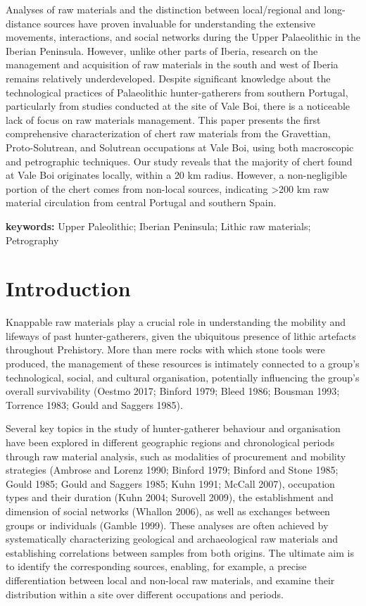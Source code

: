 \documentclass[
  a4paper,
  DIV=11,
  numbers=noendperiod]{scrreprt}
\begin{document}

Analyses of raw materials and the distinction between local/regional and
long-distance sources have proven invaluable for understanding the
extensive movements, interactions, and social networks during the Upper
Palaeolithic in the Iberian Peninsula. However, unlike other parts of
Iberia, research on the management and acquisition of raw materials in
the south and west of Iberia remains relatively underdeveloped. Despite
significant knowledge about the technological practices of Palaeolithic
hunter-gatherers from southern Portugal, particularly from studies
conducted at the site of Vale Boi, there is a noticeable lack of focus
on raw materials management. This paper presents the first comprehensive
characterization of chert raw materials from the Gravettian,
Proto-Solutrean, and Solutrean occupations at Vale Boi, using both
macroscopic and petrographic techniques. Our study reveals that the
majority of chert found at Vale Boi originates locally, within a 20 km
radius. However, a non-negligible portion of the chert comes from
non-local sources, indicating \textgreater200 km raw material
circulation from central Portugal and southern Spain.

\textbf{keywords:} Upper Paleolithic; Iberian Peninsula; Lithic raw
materials; Petrography

\newpage

\section{Introduction}\label{introduction-1}

Knappable raw materials play a crucial role in understanding the
mobility and lifeways of past hunter-gatherers, given the ubiquitous
presence of lithic artefacts throughout Prehistory. More than mere rocks
with which stone tools were produced, the management of these resources
is intimately connected to a group's technological, social, and cultural
organisation, potentially influencing the group's overall survivability
(Oestmo 2017; Binford 1979; Bleed 1986; Bousman 1993; Torrence 1983;
Gould and Saggers 1985).

Several key topics in the study of hunter-gatherer behaviour and
organisation have been explored in different geographic regions and
chronological periods through raw material analysis, such as modalities
of procurement and mobility strategies (Ambrose and Lorenz 1990; Binford
1979; Binford and Stone 1985; Gould 1985; Gould and Saggers 1985; Kuhn
1991; McCall 2007), occupation types and their duration (Kuhn 2004;
Surovell 2009), the establishment and dimension of social networks
(Whallon 2006), as well as exchanges between groups or individuals
(Gamble 1999). These analyses are often achieved by systematically
characterizing geological and archaeological raw materials and
establishing correlations between samples from both origins. The
ultimate aim is to identify the corresponding sources, enabling, for
example, a precise differentiation between local and non-local raw
materials, and examine their distribution within a site over different
occupations and periods.
\end{document}

